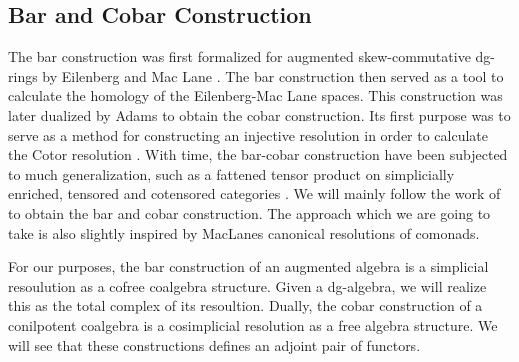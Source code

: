 \documentclass[../thesis.tex]{subfiles}
\begin{document}
    \subsection{Bar and Cobar Construction}

            The bar construction was first formalized for augmented skew-commutative dg-rings by Eilenberg and Mac Lane \cite{Eilenberg53}. The bar construction then served as a tool to calculate the homology of the Eilenberg-Mac Lane spaces. This construction was later dualized by Adams \cite{Adams56} to obtain the cobar construction. Its first purpose was to serve as a method for constructing an injective resolution in order to calculate the Cotor resolution \cite{Eilenberg65}. With time, the bar-cobar construction have been subjected to much generalization, such as a fattened tensor product on simplicially enriched, tensored and cotensored categories \cite{Riehl14}. We will mainly follow the work of \cite{Loday12} to obtain the bar and cobar construction. The approach which we are going to take is also slightly inspired by MacLanes \cite{MacLane71} canonical resolutions of comonads.

            For our purposes, the bar construction of an augmented algebra is a simplicial resoulution as a cofree coalgebra structure. Given a dg-algebra, we will realize this as the total complex of its resoultion. Dually, the cobar construction of a conilpotent coalgebra is a cosimplicial resolution as a free algebra structure. We will see that these constructions defines an adjoint pair of functors.


\end{document}
